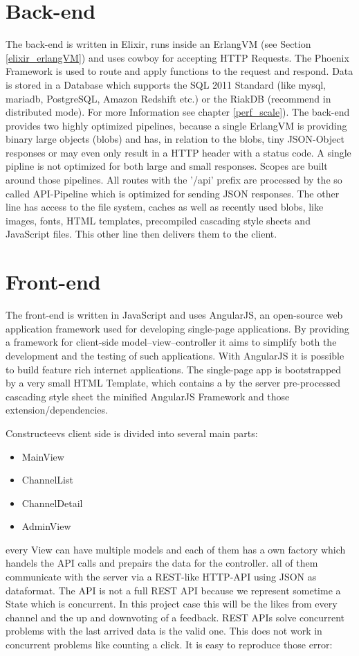 \section{Back-end}
The back-end is written in Elixir, runs inside an ErlangVM (see Section \ref{elixir_erlangVM}) and uses cowboy for accepting HTTP Requests. The Phoenix Framework is used to route and apply functions to the request and respond. Data is stored in a Database which supports the SQL 2011 Standard (like mysql, mariadb, PostgreSQL, Amazon Redshift etc.) or the RiakDB (recommend in distributed mode). For more Information see chapter \ref{perf_scale}).
The back-end provides two highly optimized pipelines, because a single ErlangVM is providing binary large objects (blobs) and has, in relation to the blobs, tiny JSON-Object responses or may even only result in a HTTP header with a status code. A single pipline is not optimized for both large and small responses. Scopes are built around those pipelines. All routes with the '/api' prefix are processed by the so called API-Pipeline which is optimized for sending JSON responses. The other line has access to the file system, caches as well as recently used blobs, like images, fonts, HTML templates, precompiled cascading style sheets and JavaScript files. This other line then delivers them to the client. 


\section{Front-end}
The front-end is written in JavaScript and uses AngularJS, an open-source web application framework used for developing single-page applications. By providing a framework for  client-side model–view–controller it aims to simplify both the development and the testing of such applications. With AngularJS it is possible to build feature rich internet applications. The single-page app is bootstrapped by a very small HTML Template, which contains a by the server pre-processed cascading style sheet the minified AngularJS Framework and those extension/dependencies.

Constructeevs client side is divided into several main parts: 
\begin{itemize}
\item MainView
\item ChannelList
\item ChannelDetail
\item AdminView 
\end{itemize}
every View can have multiple models and each of them has a own factory which handels the API calls and prepairs the data for the controller. 
all of them communicate with the server via a REST-like HTTP-API using JSON as dataformat. The API is not a full REST API because we represent sometime a State which is concurrent. In this project case this will be the likes from every channel and the up and downvoting of a feedback. REST APIs solve concurrent problems with the last arrived data is the valid one. This does not work in concurrent problems like counting a click. It is easy to reproduce those error: 

